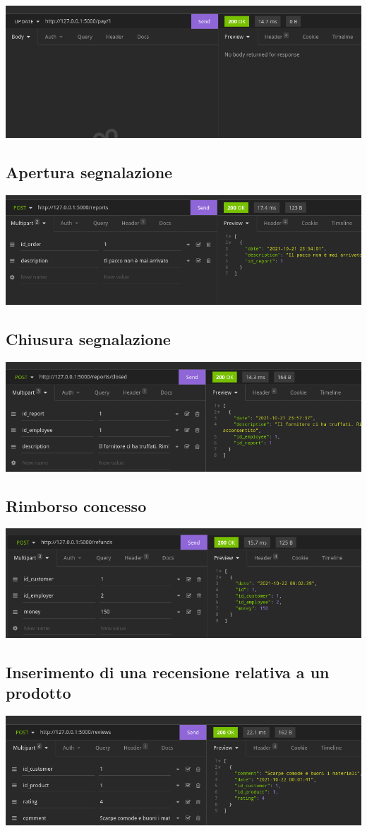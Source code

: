 \includegraphics[scale=0.33]{images/ordine_pagato.png}

\subsection{Apertura segnalazione}

\includegraphics[scale=0.33]{images/inserimento_segnalazione.png}

\subsection{Chiusura segnalazione}

\includegraphics[scale=0.28]{images/chiusura_segnalazione.png}

\subsection{Rimborso concesso}

\includegraphics[scale=0.35]{images/rimborso.png}

\subsection{Inserimento di una recensione relativa a un prodotto}

\includegraphics[scale=0.28]{images/recensione.png}
